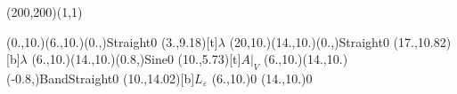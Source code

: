 \unitlength=1bp%

\begin{feynartspicture}(200,200)(1,1)

\FADiagram{}
\FAProp(0.,10.)(6.,10.)(0.,){Straight}{0}
\FALabel(3.,9.18)[t]{$\lambda$}
\FAProp(20,10.)(14.,10.)(0.,){Straight}{0}
\FALabel(17.,10.82)[b]{$\lambda$}
\FAProp(6.,10.)(14.,10.)(0.8,){Sine}{0}
\FALabel(10.,5.73)[t]{$A|_V$}
\FAProp(6.,10.)(14.,10.)(-0.8,){BandStraight}{0}
\FALabel(10.,14.02)[b]{$L_\varepsilon$}
\FAVert(6.,10.){0}
\FAVert(14.,10.){0}
\end{feynartspicture}


